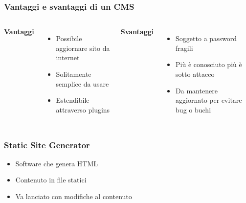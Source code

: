 \begin{frame}
	\frametitle{Vantaggi e svantaggi di un CMS}
	\begin{columns}

		\textbf{Vantaggi}
		\begin{itemize}
			\item<2-> Possibile aggiornare sito da internet
			\item<3-> Solitamente semplice da usare
			\item<4-> Estendibile attraverso plugins
		\end{itemize}


		\textbf{Svantaggi}
		\begin{itemize}
			\item<2-> Soggetto a password fragili
			\item<3-> Più è conosciuto più è sotto attacco
			\item<4-> Da mantenere aggiornato per evitare bug o buchi
		\end{itemize}

	\end{columns}
\end{frame}

\begin{frame}
	\frametitle{Static Site Generator}
	\begin{itemize}
		\item<1-> Software che genera HTML
		\item<2-> Contenuto in file statici
		\item<3-> Va lanciato con modifiche al contenuto
	\end{itemize}
\end{frame}

